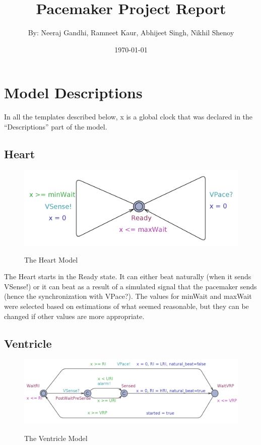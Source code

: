 \documentclass[10pt]{article}
\begin{document}
\title{\vspace{-2.0cm}Pacemaker Project Report}
\author{By: Neeraj Gandhi, Ramneet Kaur, Abhijeet Singh, Nikhil Shenoy}
\date{\today}

\maketitle

\section{Model Descriptions}
	In all the templates described below, x is a global clock that was declared in the “Descriptions” part of the model.

	\subsection{Heart}

		\begin{figure}[h]
			\includegraphics[scale=.35]{heart_model.jpg}
			\label{heart_model}
			\centering
			\caption{The Heart Model}
		\end{figure}

The Heart starts in the Ready state. It can either beat naturally (when it sends VSense!) or it can beat as a result of a simulated signal that the pacemaker sends (hence the synchronization with VPace?). The values for minWait and maxWait were selected based on estimations of what seemed reasonable, but they can be changed if other values are more appropriate.

	\subsection{Ventricle}
		\begin{figure}[h]
			\includegraphics[scale=.4]{ventricle_model.jpg}
			\label{ventricle_model}
			\centering
			\caption{The Ventricle Model}
		\end{figure}
\end{document}
